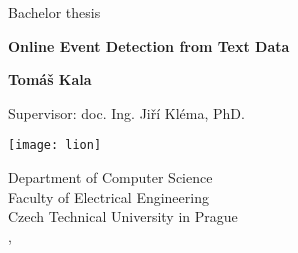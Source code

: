 \begin{titlepage}
	\begin{center}
		\vspace*{1cm}
		
		\LARGE
		Bachelor thesis
		
		\Huge
		\textbf{Online Event Detection from Text Data}
		
		\vspace{1.5cm}
		
		\Large
		\textbf{Tomáš Kala}

		\vspace{1cm}

		\Large
		Supervisor: doc. Ing. Jiří Kléma, PhD.
		
		\vfill

		\texttt{[image: lion]}
		
		\Large
		Department of Computer Science\\
		Faculty of Electrical Engineering\\
		Czech Technical University in Prague\\
		\monthname, \the\year
	\end{center}
\end{titlepage}